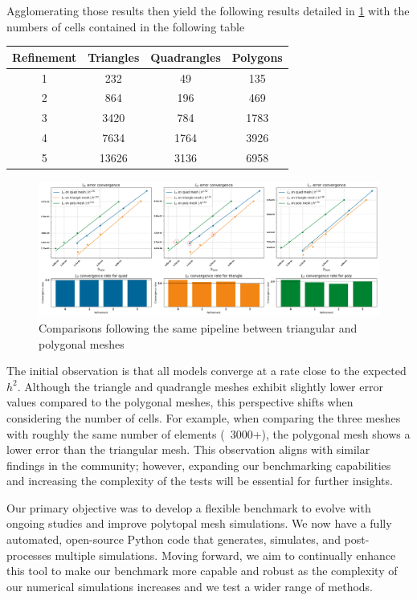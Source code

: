 \documentclass{article}
\begin{document}
Agglomerating those results then yield the following results detailed in \cref{ResultsBench} with the numbers of cells contained in the following table\\
\begin{center}
	\begin{tabular}{||c c c c||}
		\hline
		Refinement & Triangles & Quadrangles & Polygons \\ [0.5ex]
		\hline\hline
		1 & 232 & 49 & 135 \\
		\hline
		2 & 864 & 196 & 469 \\
		\hline
		3 & \color{red}3420 & 784 & 1783 \\
		\hline
		4 & 7634 & 1764 & \color{red}3926 \\
		\hline
		5 & 13626 & \color{red}3136 & 6958 \\ [1ex]
		\hline
	\end{tabular}
\end{center}

\begin{figure}[htbp]
	\centering
	\includegraphics[width=1.0\textwidth]{./Images/ResultsBench.png}
	\caption{\label{ResultsBench} Comparisons following the same pipeline between triangular and polygonal meshes}
\end{figure}
The initial observation is that all models converge at a rate close to the expected $h^2$. Although the triangle and quadrangle meshes exhibit slightly lower error values compared to the polygonal meshes, this perspective shifts when considering the number of cells. For example, when comparing the three meshes with roughly the same number of elements (~3000+), the polygonal mesh shows a lower error than the triangular mesh. This observation aligns with similar findings in the community; however, expanding our benchmarking capabilities and increasing the complexity of the tests will be essential for further insights.

Our primary objective was to develop a flexible benchmark to evolve with ongoing studies and improve polytopal mesh simulations. We now have a fully automated, open-source Python code that generates, simulates, and post-processes multiple simulations. Moving forward, we aim to continually enhance this tool to make our benchmark more capable and robust as the complexity of our numerical simulations increases and we test a wider range of methods.
\end{document}
